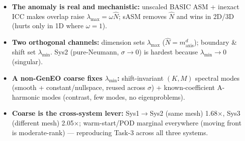 \documentclass[aspectratio=169,9pt]{beamer}
\begin{document}
{
\begin{frame}[plain]
  \par\vspace{0.2em}{\color{teal}\rule{\linewidth}{1.4pt}}\vspace{0.5em}
  {\footnotesize\color{white}
  \begin{itemize}\setlength\itemsep{0.5em}
   \item[\textcolor{amber}{\textbf{1}}] \textbf{\textcolor{amber}{The anomaly is real and mechanistic:}} unscaled BASIC ASM + inexact ICC makes overlap raise $\lambda_{\max}{=}\omega\hat N$; sASM removes $\hat N$ and wins in 2D/3D (hurts only in 1D where $\omega{=}1$).
   \item[\textcolor{amber}{\textbf{2}}] \textbf{\textcolor{amber}{Two orthogonal channels:}} dimension sets $\lambda_{\max}$ ($\hat N{=}m_{\text{axis}}^d$); boundary \& shift set $\lambda_{\min}$. Sys2 (pure-Neumann, $\sigma{\to}0$) is hardest because $\lambda_{\min}{\to}0$ (singular).
   \item[\textcolor{amber}{\textbf{3}}] \textbf{\textcolor{amber}{A non-GenEO coarse fixes $\lambda_{\min}$:}} shift-invariant $(K,M)$ spectral modes (smooth + constant/nullspace, reused across $\sigma$) + known-coefficient A-harmonic modes (contrast, few modes, no eigenproblems).
   \item[\textcolor{amber}{\textbf{4}}] \textbf{\textcolor{amber}{Coarse is the cross-system lever:}} Sys1$\to$Sys2 (same mesh) 1.68$\times$, Sys3 (different mesh) 2.05$\times$; warm-start/POD marginal everywhere (moving front is moderate-rank) — reproducing Task-3 across all three systems.
  \end{itemize}}
\end{frame}}
\end{document}
